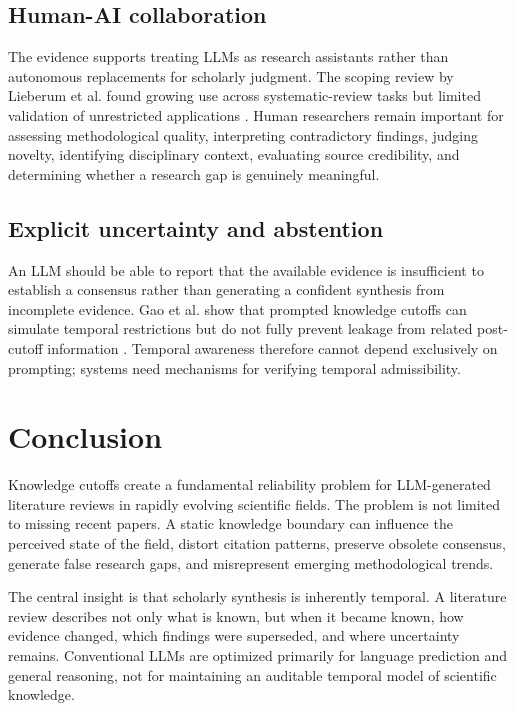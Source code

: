 \documentclass[manuscript,screen]{acmart}
\begin{document}
\subsection{Human-AI collaboration}\label{subsec:human-ai}
The evidence supports treating LLMs as research assistants rather than autonomous replacements for scholarly
judgment. The scoping review by Lieberum et al. found growing use across systematic-review tasks but limited
validation of unrestricted applications \cite{lieberum2025}. Human researchers remain important for assessing
methodological quality, interpreting contradictory findings, judging novelty, identifying disciplinary context,
evaluating source credibility, and determining whether a research gap is genuinely meaningful.

\subsection{Explicit uncertainty and abstention}\label{subsec:uncertainty}
An LLM should be able to report that the available evidence is insufficient to establish a consensus rather than
generating a confident synthesis from incomplete evidence. Gao et al. show that prompted knowledge cutoffs can
simulate temporal restrictions but do not fully prevent leakage from related post-cutoff information
\cite{gao2025}. Temporal awareness therefore cannot depend exclusively on prompting; systems need mechanisms
for verifying temporal admissibility.

\section{Conclusion}\label{sec:conclusion}
Knowledge cutoffs create a fundamental reliability problem for LLM-generated literature reviews in rapidly
evolving scientific fields. The problem is not limited to missing recent papers. A static knowledge boundary can
influence the perceived state of the field, distort citation patterns, preserve obsolete consensus, generate
false research gaps, and misrepresent emerging methodological trends.

The central insight is that scholarly synthesis is inherently temporal. A literature review describes not only
what is known, but when it became known, how evidence changed, which findings were superseded, and where
uncertainty remains. Conventional LLMs are optimized primarily for language prediction and general reasoning,
not for maintaining an auditable temporal model of scientific knowledge.
\end{document}
